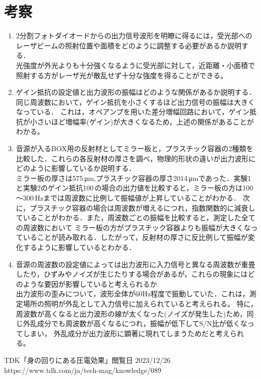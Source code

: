 \documentclass{ltjsarticle}
\begin{document}
\section{考察}
	\begin{enumerate}
		\item 2分割フォトダイオードからの出力信号波形を明瞭に得るには，受光部へのレーザビームの照射位置や面積をどのように調整する必要があるか説明する．\\
			光強度が外光よりも十分強くなるように受光部に対して，近距離・小面積で照射する方がレーザ光が散乱せず十分な強度を得ることができる。
		\item ゲイン抵抗の設定値と出力波形の振幅はどのような関係があるか説明する．\\
			同じ周波数において，ゲイン抵抗を小さくするほど出力信号の振幅は大きくなっている．
			これは，オペアンプを用いた差分増幅回路において，ゲイン抵抗が小さいほど増幅率(ゲイン)が大きくなるため，上述の関係があることがわかる。
		\item 音源が入るBOX用の反射材としてミラー板と，プラスチック容器の2種類を比較した．これらの各反射材の厚さを調べ，物理的形状の違いが出力波形にどのように影響しているか説明する．\\
			ミラー板の厚さは575\,μm,プラスチック容器の厚さ2014\,μmであった．実験1と実験2のゲイン抵抗100\,\Omega の場合の出力値を比較すると，ミラー板の方は100～300\,Hzまでは周波数に比例して振幅値が上昇していることがわかる．
			次に，プラスチック容器の場合は周波数が増えるにつれ，指数関数的に減衰していることがわかる．また，周波数ごとの振幅を比較すると，測定した全ての周波数において
			ミラー板の方がプラスチック容器よりも振幅が大きくなっていることが読み取れる．したがって，反射材の厚さに反比例して振幅が変化するように影響しているとわかる．
		\item 音源の周波数の設定値によっては出力波形に入力信号と異なる周波数が重畳したり，ひずみやノイズが生じたりする場合があるが，これらの現象にはどのような要因が影響していると考えられるか.\\
			出力波形の歪みについて，波形全体が60Hz程度で振動していた．これは，測定場所の照明が外乱として入力信号に加えられていると考えられる。
			特に，周波数が高くなると出力波形の線が太くなった(ノイズが発生した)ため，同じ外乱成分でも周波数が高くなるにつれ，振幅が低下してS/N比が低くなってしまい，
			外乱成分が出力波形に顕著に現れてしまうためだと考えられる。
	\end{enumerate}
\begin{thebibliography}{99}
	TDK「身の回りにある圧電効果」閲覧日 2023/12/26\\
	https://www.tdk.com/ja/tech-mag/knowledge/089
\end{thebibliography}
\end{document}

